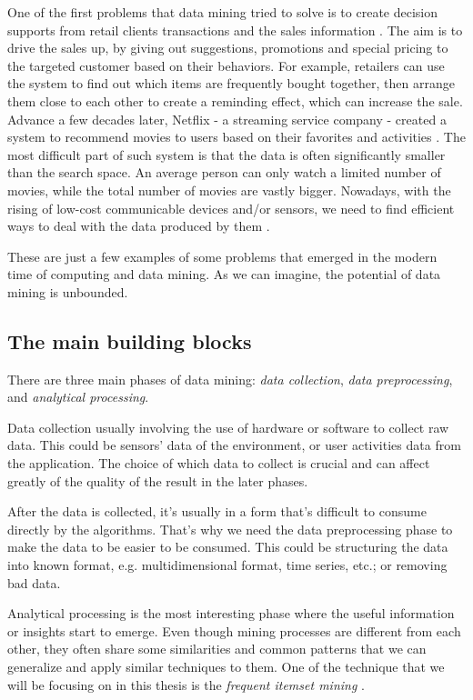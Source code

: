 One of the first problems that data mining tried to solve is to create decision supports from retail clients transactions and the sales information \citep{coenen_datamining_2011}. 
The aim is to drive the sales up, by giving out suggestions, promotions and special pricing to the targeted customer based on their behaviors.
For example, retailers can use the system to find out which items are frequently bought together, then arrange them close to each other to create a reminding effect, which can increase the sale.
Advance a few decades later, Netflix - a streaming service company - created a system to recommend movies to users based on their favorites and activities \citep{netflix_rs_2016}.
The most difficult part of such system is that the data is often significantly smaller than the search space.
An average person can only watch a limited number of movies, while the total number of movies are vastly bigger.
Nowadays, with the rising of low-cost communicable devices and/or sensors, we need to find efficient ways to deal with the data produced by them \citep{data_mining_iot_2014}.

These are just a few examples of some problems that emerged in the modern time of computing and data mining.
As we can imagine, the potential of data mining is unbounded.

\subsection{The main building blocks}
\label{sub:building_blocks}
There are three main phases of data mining: \textit{data collection}, \textit{data preprocessing}, and \textit{analytical processing}.

Data collection usually involving the use of hardware or software to collect raw data.
This could be sensors' data of the environment, or user activities data from the application.
The choice of which data to collect is crucial and can affect greatly of the quality of the result in the later phases.

After the data is collected, it's usually in a form that's difficult to consume directly by the algorithms.
That's why we need the data preprocessing phase to make the data to be easier to be consumed.
This could be structuring the data into known format, e.g. multidimensional format, time series, etc.; or removing bad data.

Analytical processing is the most interesting phase where the useful information or insights start to emerge.
Even though mining processes are different from each other, they often share some similarities and common patterns that we can generalize and apply similar techniques to them.
One of the technique that we will be focusing on in this thesis is the \textit{frequent itemset mining} \citep{borgelt_fim_2012}.

